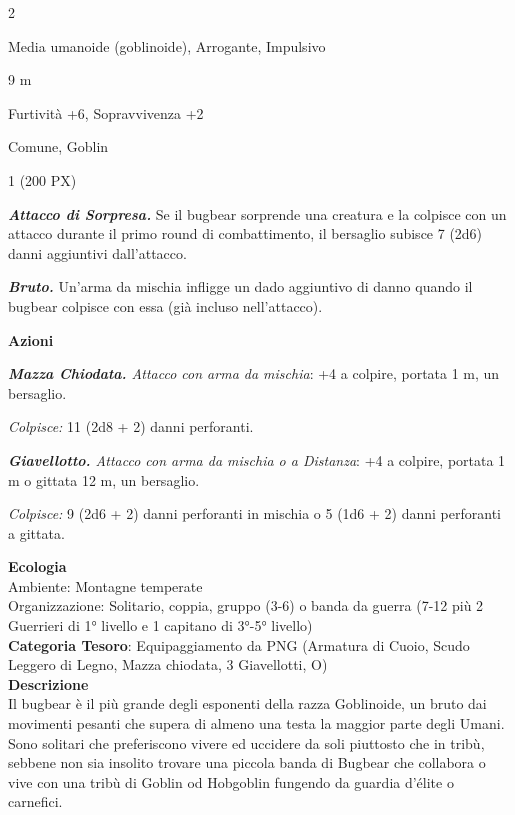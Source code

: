 \begin{multicols}{2}
{
\begin{description}[noitemsep, topsep=0pt, parsep=0pt, partopsep=0pt, itemsep=1pt, leftmargin=2.35cm,  labelwidth=2.2cm, itemindent=0cm, listparindent=0pt] %
\setlength{\baselineskip}{10pt}
\item[\textbf{Taglia/Tipo}] Media umanoide (goblinoide), Arrogante, Impulsivo
\item[\textbf{Caratt.}] 
\item[\textbf{Punti Ferita}] 
\item[\textbf{Movimento}] 9 m
\item[\textbf{Tiri Salvez.}] 
\item[\textbf{Comp.}] Furtività +6, Sopravvivenza +2
\item[\textbf{Sensi}] 
\item[\textbf{Linguaggi}] Comune, Goblin
\item[\textbf{Sfida}] 1 (200 PX)
\end{description}
\smallskip

\emph{\textbf{Attacco di Sorpresa.}} Se il bugbear sorprende una creatura e la colpisce con un attacco durante il primo round di combattimento, il bersaglio subisce 7 (2d6) danni aggiuntivi dall'attacco.

\emph{\textbf{Bruto.}} Un'arma da mischia infligge un dado aggiuntivo di danno quando il bugbear colpisce con essa (già incluso nell'attacco).

\textbf{Azioni}

\emph{\textbf{Mazza Chiodata.} Attacco con arma da mischia}: +4 a colpire, portata 1 m, un bersaglio.

\emph{Colpisce:} 11 (2d8 + 2) danni perforanti.

\emph{\textbf{Giavellotto.} Attacco con arma da mischia o a Distanza}: +4 a colpire, portata 1 m o gittata 12 m, un bersaglio.

\emph{Colpisce:} 9 (2d6 + 2) danni perforanti in mischia o 5 (1d6 + 2) danni perforanti a gittata.

\textbf{Ecologia}\\
Ambiente: Montagne temperate\\
Organizzazione: Solitario, coppia, gruppo (3-6) o banda da guerra (7-12 più 2 Guerrieri di 1° livello e 1 capitano di 3°-5° livello)\\
\textbf{Categoria Tesoro}: Equipaggiamento da PNG (Armatura di Cuoio, Scudo Leggero di Legno, Mazza chiodata, 3 Giavellotti, O)\\
\textbf{Descrizione}\\
Il bugbear è il più grande degli esponenti della razza Goblinoide, un bruto dai movimenti pesanti che supera di almeno una testa la maggior parte degli Umani. Sono solitari che preferiscono vivere ed uccidere da soli piuttosto che in tribù, sebbene non sia insolito trovare una piccola banda di Bugbear che collabora o vive con una tribù di Goblin od Hobgoblin fungendo da guardia d'élite o carnefici.

}
\end{multicols}
